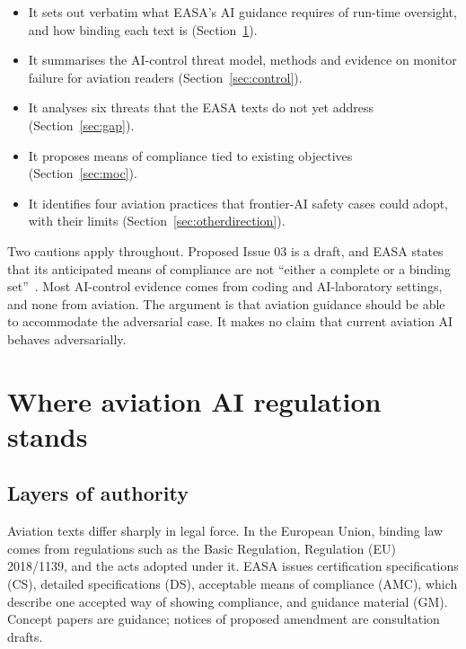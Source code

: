 \documentclass[11pt]{article}
\begin{document}
\begin{itemize}
\item It sets out verbatim what EASA's AI guidance requires of run-time oversight, and how binding each text is (Section~\ref{sec:regulation}).
\item It summarises the AI-control threat model, methods and evidence on monitor failure for aviation readers (Section~\ref{sec:control}).
\item It analyses six threats that the EASA texts do not yet address (Section~\ref{sec:gap}).
\item It proposes means of compliance tied to existing objectives (Section~\ref{sec:moc}).
\item It identifies four aviation practices that frontier-AI safety cases could adopt, with their limits (Section~\ref{sec:otherdirection}).
\end{itemize}

Two cautions apply throughout. Proposed Issue 03 is a draft, and EASA states that its anticipated means of compliance are not ``either a complete or a binding set''~\cite[Section~B]{easa2026concept}. Most AI-control evidence comes from coding and AI-laboratory settings, and none from aviation. The argument is that aviation guidance should be able to accommodate the adversarial case. It makes no claim that current aviation AI behaves adversarially.

\section{Where aviation AI regulation stands}\label{sec:regulation}

\subsection{Layers of authority}\label{sec:layers}

Aviation texts differ sharply in legal force. In the European Union, binding law comes from regulations such as the Basic Regulation, Regulation (EU) 2018/1139, and the acts adopted under it. EASA issues certification specifications (CS), detailed specifications (DS), acceptable means of compliance (AMC), which describe one accepted way of showing compliance, and guidance material (GM). Concept papers are guidance; notices of proposed amendment are consultation drafts.
\end{document}
